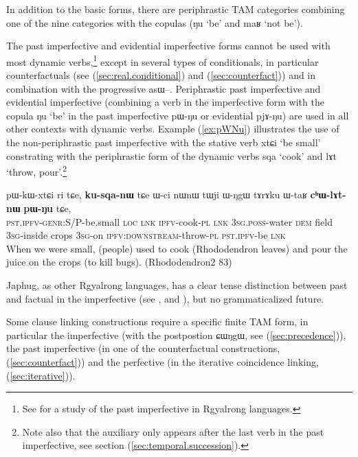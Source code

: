 \documentclass[oldfontcommands,oneside,a4paper,11pt]{article}
\newcommand{\ipa}[1]{{\phon \mbox{#1}}} %
\newcommand{\refb}[1]{(\ref{#1})}
\begin{document}
In addition to the basic forms, there are periphrastic TAM categories combining one of the nine categories with the copulas (\ipa{ŋu} `be' and \ipa{maʁ} `not be').


The past imperfective  and   evidential imperfective forms cannot be used with most dynamic verbs,\footnote{ See \citet{lin11direction} for a study of the past imperfective in Rgyalrong languages. } except in    several types of conditionals, in particular counterfactuals (see \refb{sec:real.conditional} and \refb{sec:counterfact}) and in combination with the progressive  \ipa{asɯ}--. Periphrastic past imperfective and evidential imperfective (combining a verb in the imperfective form with the copula \ipa{ŋu} `be' in the past imperfective \ipa{pɯ-ŋu} or evidential \ipa{pjɤ-ŋu}) are used in all other contexts with dynamic verbs. Example \refb{ex:pWNu} illustrates the use of the non-periphrastic past imperfective with the stative verb \ipa{xtɕi} `be small' constrating with  the periphrastic form of the dynamic verbs \ipa{sqa} `cook' and \ipa{lɤt} `throw, pour'.\footnote{Note also that the auxiliary only appears after the last verb in the past imperfective, see section \refb{sec:temporal.succession}. }

\begin{exe}
\ex \label{ex:pWNu}
\gll
\ipa{pɯ-kɯ-xtɕi}  	\ipa{ri}  	\ipa{tɕe,}  	\textbf{\ipa{ku-sqa-nɯ}}  	\ipa{tɕe}  	\ipa{ɯ-ci}  	\ipa{nɯnɯ}  	\ipa{tɯji}  	\ipa{ɯ-ŋgɯ}  	\ipa{tɤrɤku}  	\ipa{ɯ-taʁ}  	\textbf{\ipa{cʰɯ-lɤt-nɯ}}  	\textbf{\ipa{pɯ-ŋu}}  	\ipa{tɕe,}   \\
\textsc{pst.ipfv-genr}:S/P-be.small  \textsc{loc} \textsc{lnk} \textsc{ipfv}-cook-\textsc{pl} \textsc{lnk} \textsc{3sg.poss}-water \textsc{dem} field \textsc{3sg}-inside crops \textsc{3sg}-on \textsc{ipfv:downstream}-throw-\textsc{pl} \textsc{pst.ipfv}-be \textsc{lnk}\\
  \glt When we were small, (people) used to cook (Rhododendron leaves) and pour the juice on the crops (to kill bugs). (Rhododendron2 83)
  \end{exe}  
  
 Japhug, as other Rgyalrong languages, has a clear tense distinction between past and factual in the imperfective (see \citealt{jackson00puxi}, \citealt{linyj03tense} and \citealt[371-392]{jacques04these}), but no grammaticalized future. 
 
 Some clause linking constructions require a specific finite TAM form, in particular the  imperfective (with the postpostion \ipa{ɕɯŋgɯ}, see \refb{sec:precedence}), the past imperfective (in one of the counterfactual constructions, \refb{sec:counterfact}) and the perfective (in the iterative coincidence linking, \refb{sec:iterative}).
  
\end{document}
